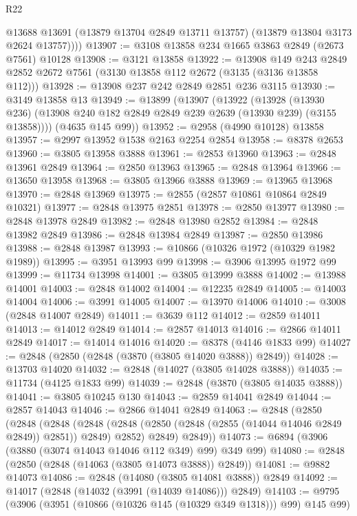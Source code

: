 \begin{lexlean}{R22}
\begin{coremodule}
          @13688
          @13691
          (@13879 @13704 @2849 @13711 @13757)
          (@13879 @13804 @3173 @2624 @13757))))
@13907 := @3108 @13858 @234 @1665 @3863 @2849 (@2673 @7561) @10128
@13908 := @3121 @13858
@13922 := @13908
    @149
    @243
    @2849
    @2852
    @2672
    @7561
    (@3130 @13858 @112 @2672 (@3135 (@3136 @13858 @112)))
@13928 := @13908 @237 @242 @2849 @2851 @236 @3115
@13930 := @3149 @13858 @13
@13949 := @13899
    (@13907
      (@13922
        (@13928
          (@13930 @236)
          (@13908 @240 @182 @2849 @2849 @239 @2639 (@13930 @239) (@3155 @13858))))
      (@4635 @145 @99))
@13952 := @2958 (@4990 @10128) @13858
@13957 := @2997 @13952 @1538 @2163 @2254 @2854
@13958 := @8378 @2653
@13960 := @3805 @13958 @3888
@13961 := @2853 @13960
@13963 := @2848 @13961 @2849
@13964 := @2850 @13963
@13965 := @2848 @13964
@13966 := @13650 @13958
@13968 := @3805 @13966 @3888
@13969 := @13965 @13968
@13970 := @2848 @13969
@13975 := @2855 (@2857 @10861 @10864 @2849 @10321)
@13977 := @2848 @13975 @2851
@13978 := @2850 @13977
@13980 := @2848 @13978 @2849
@13982 := @2848 @13980 @2852
@13984 := @2848 @13982 @2849
@13986 := @2848 @13984 @2849
@13987 := @2850 @13986
@13988 := @2848 @13987
@13993 := @10866 (@10326 @1972 (@10329 @1982 @1989))
@13995 := @3951 @13993 @99
@13998 := @3906 @13995 @1972 @99
@13999 := @11734 @13998
@14001 := @3805 @13999 @3888
@14002 := @13988 @14001
@14003 := @2848 @14002
@14004 := @12235 @2849
@14005 := @14003 @14004
@14006 := @3991 @14005
@14007 := @13970 @14006
@14010 := @3008 (@2848 @14007 @2849)
@14011 := @3639 @112
@14012 := @2859 @14011
@14013 := @14012 @2849
@14014 := @2857 @14013
@14016 := @2866 @14011 @2849
@14017 := @14014 @14016
@14020 := @8378 (@4146 @1833 @99)
@14027 := @2848 (@2850 (@2848 (@3870 (@3805 @14020 @3888)) @2849))
@14028 := @13703 @14020
@14032 := @2848 (@14027 (@3805 @14028 @3888))
@14035 := @11734 (@4125 @1833 @99)
@14039 := @2848 (@3870 (@3805 @14035 @3888))
@14041 := @3805 @10245 @130
@14043 := @2859 @14041 @2849
@14044 := @2857 @14043
@14046 := @2866 @14041 @2849
@14063 := @2848
    (@2850
      (@2848
        (@2848
          (@2848 (@2848 (@2850 (@2848 (@2855 (@14044 @14046 @2849 @2849)) @2851)) @2849) @2852)
          @2849)
        @2849))
@14073 := @6894 (@3906 (@3880 (@3074 @14043 @14046 @112 @349) @99) @349 @99)
@14080 := @2848 (@2850 (@2848 (@14063 (@3805 @14073 @3888)) @2849))
@14081 := @9882 @14073
@14086 := @2848 (@14080 (@3805 @14081 @3888)) @2849
@14092 := @14017 (@2848 (@14032 (@3991 (@14039 @14086))) @2849)
@14103 := @9795 (@3906 (@3951 (@10866 (@10326 @145 (@10329 @349 @1318))) @99) @145 @99)

\end{coremodule}
\end{lexlean}
